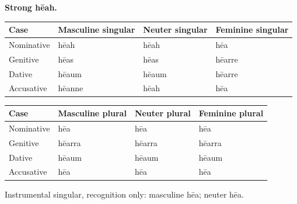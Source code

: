 \par\begin{minipage}{\linewidth}\raggedright
\textbf{Strong hēah.}

\par\begingroup
\fontsize{10.5}{13.2}\selectfont
\setlength{\LTleft}{0pt}\setlength{\LTright}{\fill}
\noindent
\begin{tabular}{@{}>{\raggedright\arraybackslash}p{22.0mm}>{\raggedright\arraybackslash}p{31.188mm}>{\raggedright\arraybackslash}p{31.188mm}>{\raggedright\arraybackslash}p{31.188mm}@{}}
\toprule
\textbf{Case} & \textbf{Masculine singular} & \textbf{Neuter singular} & \textbf{Feminine singular} \\
\midrule
Nominative & hēah & hēah & hēa \\
Genitive & hēas & hēas & hēarre \\
Dative & hēaum & hēaum & hēarre \\
Accusative & hēanne & hēah & hēa \\
\bottomrule
\end{tabular}
\par\endgroup
\par\addvspace{5pt}
\par\begingroup
\fontsize{10.5}{13.2}\selectfont
\setlength{\LTleft}{0pt}\setlength{\LTright}{\fill}
\noindent
\begin{tabular}{@{}>{\raggedright\arraybackslash}p{22.0mm}>{\raggedright\arraybackslash}p{31.188mm}>{\raggedright\arraybackslash}p{31.188mm}>{\raggedright\arraybackslash}p{31.188mm}@{}}
\toprule
\textbf{Case} & \textbf{Masculine plural} & \textbf{Neuter plural} & \textbf{Feminine plural} \\
\midrule
Nominative & hēa & hēa & hēa \\
Genitive & hēarra & hēarra & hēarra \\
Dative & hēaum & hēaum & hēaum \\
Accusative & hēa & hēa & hēa \\
\bottomrule
\end{tabular}
\par\endgroup
\end{minipage}\par
Instrumental singular, recognition only: masculine hēa; neuter hēa.

